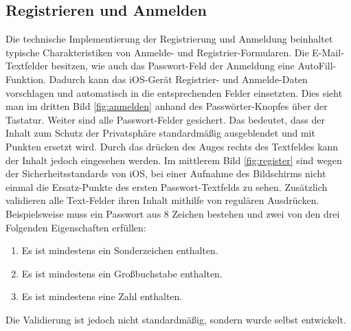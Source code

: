 \documentclass[notables, nomenclature, oneside, 150]{HSMW-Thesis}
\begin{document}
		\subsection{Registrieren und Anmelden}
			Die technische Implementierung der Registrierung und Anmeldung beinhaltet typische Charakteristiken von Anmelde- und Registrier-Formularen. Die E-Mail-Textfelder besitzen, wie auch das Passwort-Feld der Anmeldung eine AutoFill-Funktion. Dadurch kann das iOS-Gerät Registrier- und Anmelde-Daten vorschlagen und automatisch in die entsprechenden Felder einsetzten. Dies sieht man im dritten Bild \ref{fig:anmelden} anhand des \glqq Passwörter\grqq -Knopfes über der Tastatur.  Weiter sind alle Passwort-Felder gesichert. Das bedeutet, dass der Inhalt zum Schutz der Privatsphäre standardmäßig ausgeblendet und mit Punkten ersetzt wird. Durch das drücken des Auges rechts des Textfeldes kann der Inhalt jedoch eingesehen werden. Im mittlerem Bild \ref{fig:register} sind wegen der Sicherheitsstandards von iOS, bei einer Aufnahme des Bildschirms nicht einmal die Ersatz-Punkte des ersten Passwort-Textfelds zu sehen. Zusätzlich validieren alle Text-Felder ihren Inhalt mithilfe von regulären Ausdrücken. Beispielsweise muss ein Passwort aus 8 Zeichen bestehen und zwei von den drei Folgenden Eigenschaften erfüllen:
			\begin{enumerate}
				\item Es ist mindestens ein Sonderzeichen enthalten.
				\item Es ist mindestens ein Großbuchstabe enthalten.
				\item Es ist mindestens eine Zahl enthalten.
			\end{enumerate}
			Die Validierung ist jedoch nicht standardmäßig, sondern wurde selbst entwickelt.
			
\end{document}
